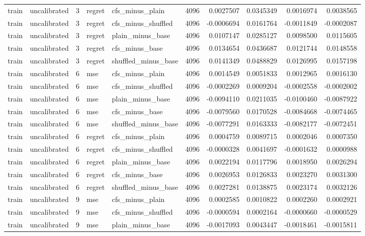 \begin{tabular}{llrllrrrrr}
train & uncalibrated & 3 & regret & cfs_minus_plain & 4096 & 0.0027507 & 0.0345349 & 0.0016974 & 0.0038565 \\
train & uncalibrated & 3 & regret & cfs_minus_shuffled & 4096 & -0.0006694 & 0.0161764 & -0.0011849 & -0.0002087 \\
train & uncalibrated & 3 & regret & plain_minus_base & 4096 & 0.0107147 & 0.0285127 & 0.0098500 & 0.0115605 \\
train & uncalibrated & 3 & regret & cfs_minus_base & 4096 & 0.0134654 & 0.0436687 & 0.0121744 & 0.0148558 \\
train & uncalibrated & 3 & regret & shuffled_minus_base & 4096 & 0.0141349 & 0.0488829 & 0.0126995 & 0.0157198 \\
train & uncalibrated & 6 & mse & cfs_minus_plain & 4096 & 0.0014549 & 0.0051833 & 0.0012965 & 0.0016130 \\
train & uncalibrated & 6 & mse & cfs_minus_shuffled & 4096 & -0.0002269 & 0.0009204 & -0.0002558 & -0.0002002 \\
train & uncalibrated & 6 & mse & plain_minus_base & 4096 & -0.0094110 & 0.0211035 & -0.0100460 & -0.0087922 \\
train & uncalibrated & 6 & mse & cfs_minus_base & 4096 & -0.0079560 & 0.0170528 & -0.0084668 & -0.0074465 \\
train & uncalibrated & 6 & mse & shuffled_minus_base & 4096 & -0.0077291 & 0.0163333 & -0.0082177 & -0.0072451 \\
train & uncalibrated & 6 & regret & cfs_minus_plain & 4096 & 0.0004759 & 0.0089715 & 0.0002046 & 0.0007350 \\
train & uncalibrated & 6 & regret & cfs_minus_shuffled & 4096 & -0.0000328 & 0.0041697 & -0.0001632 & 0.0000988 \\
train & uncalibrated & 6 & regret & plain_minus_base & 4096 & 0.0022194 & 0.0117796 & 0.0018950 & 0.0026294 \\
train & uncalibrated & 6 & regret & cfs_minus_base & 4096 & 0.0026953 & 0.0126833 & 0.0023270 & 0.0031300 \\
train & uncalibrated & 6 & regret & shuffled_minus_base & 4096 & 0.0027281 & 0.0138875 & 0.0023174 & 0.0032126 \\
train & uncalibrated & 9 & mse & cfs_minus_plain & 4096 & 0.0002585 & 0.0010822 & 0.0002260 & 0.0002921 \\
train & uncalibrated & 9 & mse & cfs_minus_shuffled & 4096 & -0.0000594 & 0.0002164 & -0.0000660 & -0.0000529 \\
train & uncalibrated & 9 & mse & plain_minus_base & 4096 & -0.0017093 & 0.0043447 & -0.0018461 & -0.0015811 \\

\end{tabular}
